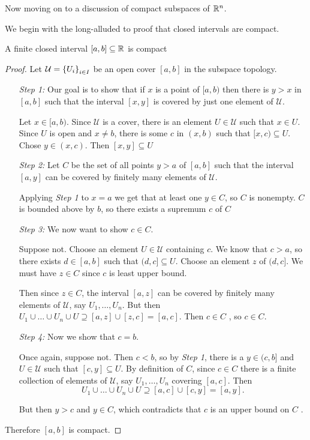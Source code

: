 \documentclass[12pt, twosided]{article}
\begin{document}
Now moving on to a discussion of compact subspaces of \(\mathbb{R}^n\).

We begin with the long-alluded to proof that closed intervals are compact.
\begin{thm}
  A finite closed interval \([a, b] \subseteq \mathbb{R}\) is compact
\end{thm}
\begin{proof}
  Let \(\mathcal{U} = \left\{ U_i \right\}_{i \in I}\) be an open cover \([a, b]\) in the subspace topology.

  \begin{enumerate}
  \item [\emph{Step 1:}] Our goal is to show that if \(x\) is a point of \([a, b)\) then there is \(y > x\) in \([a, b]\) such that the interval \([x, y]\) is covered by just one element of \(\mathcal{U}\).

    Let \(x \in [a, b)\). Since \(\mathcal{U}\) is a cover, there is an element \(U \in \mathcal{U}\) such that \(x \in U\). Since \(U\) is open and \(x \neq b\), there is some \(c\) in \((x, b)\) such that \([x, c) \subseteq U\). Chose \(y \in (x, c)\). Then \([x, y] \subseteq U\) \partdone
  \item [\emph{Step 2:}] Let \(C\) be the set of all points \(y > a\) of \([a, b]\) such that the interval \([a, y]\) can be covered by finitely many elements of \(\mathcal{U}\). 

    Applying \emph{Step 1} to \(x = a\) we get that at least one \(y \in C\), so \(C\) is nonempty. \(C\) is bounded above by \(b\), so there exists a supremum \(c\) of \(C\) \partdone
  \item [\emph{Step 3:}] We now want to show \(c \in C\).

    Suppose not. Choose an element \(U \in \mathcal{U}\) containing \(c\). We know that \(c > a\), so there exists \(d \in [a, b]\) such that \((d, c] \subseteq U\). Choose an element \(z\) of \((d, c]\). We must have \(z \in C\) since \(c\) is least upper bound. \partdone

    Then since \(z \in C\), the interval \([a, z]\) can be covered by finitely many elements of \(\mathcal{U}\), say \(U_1, \ldots, U_n\). But then \(U_1 \cup \ldots \cup U_n \cup U \supseteq [a, z] \cup [z, c] = [a, c]\). Then \(c \in C\) \nope, so \(c \in C\). \partdone
  \item [\emph{Step 4:}] Now we show that \(c = b\).

    Once again, suppose not. Then \(c < b\), so by \emph{Step 1}, there is a \(y \in (c, b]\) and \(U \in \mathcal{U}\) such that \([c, y] \subseteq U\). By definition of \(C\), since \(c \in C\) there is a finite collection of elements of \(\mathcal{U}\), say \(U_1, \ldots, U_n\) covering \([a, c]\). Then \[U_1 \cup \ldots \cup U_n \cup U \supseteq [a, c] \cup [c, y] = [a, y].\]

    But then \(y > c\) and \(y \in C\), which contradicts that \(c\) is an upper bound on \(C\) \nope. \partdone
  \end{enumerate}

  Therefore \([a, b]\) is compact.
\end{proof}
\end{document}
